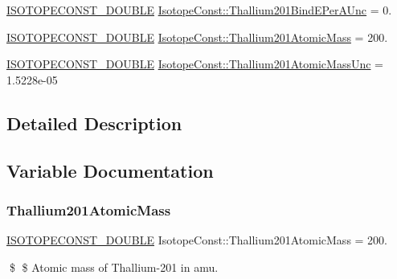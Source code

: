 \begin{DoxyCompactItemize}
\mbox{\hyperlink{group___isotope_const-_macros_ga8f45a7272ce02c0b4c65c44636ed719a}{I\+S\+O\+T\+O\+P\+E\+C\+O\+N\+S\+T\+\_\+\+D\+O\+U\+B\+LE}} \mbox{\hyperlink{group___isotope_const-_thallium-_tl201_gab3ad0250ce87561ba0cf3d6d45d1b7f0}{Isotope\+Const\+::\+Thallium201\+Bind\+E\+Per\+A\+Unc}} = 0.
\item 
\mbox{\hyperlink{group___isotope_const-_macros_ga8f45a7272ce02c0b4c65c44636ed719a}{I\+S\+O\+T\+O\+P\+E\+C\+O\+N\+S\+T\+\_\+\+D\+O\+U\+B\+LE}} \mbox{\hyperlink{group___isotope_const-_thallium-_tl201_gae689e6c3d9e782ce67c8f843bc2b8ee2}{Isotope\+Const\+::\+Thallium201\+Atomic\+Mass}} = 200.
\item 
\mbox{\hyperlink{group___isotope_const-_macros_ga8f45a7272ce02c0b4c65c44636ed719a}{I\+S\+O\+T\+O\+P\+E\+C\+O\+N\+S\+T\+\_\+\+D\+O\+U\+B\+LE}} \mbox{\hyperlink{group___isotope_const-_thallium-_tl201_ga209673e476a9158e55341051b1ea5c3b}{Isotope\+Const\+::\+Thallium201\+Atomic\+Mass\+Unc}} = 1.\+5228e-\/05
\end{DoxyCompactItemize}


\subsection{Detailed Description}


\subsection{Variable Documentation}
\mbox{\label{group___isotope_const-_thallium-_tl201_gae689e6c3d9e782ce67c8f843bc2b8ee2}} 
\subsubsection{\texorpdfstring{Thallium201\+Atomic\+Mass}{Thallium201AtomicMass}}
{\footnotesize\ttfamily \mbox{\hyperlink{group___isotope_const-_macros_ga8f45a7272ce02c0b4c65c44636ed719a}{I\+S\+O\+T\+O\+P\+E\+C\+O\+N\+S\+T\+\_\+\+D\+O\+U\+B\+LE}} Isotope\+Const\+::\+Thallium201\+Atomic\+Mass = 200.}

\$ \$ Atomic mass of Thallium-\/201 in amu. \mbox{\label{group___isotope_const-_thallium-_tl201_ga209673e476a9158e55341051b1ea5c3b}} 
